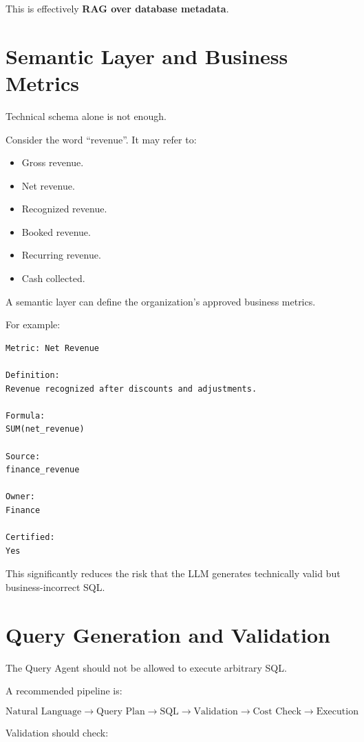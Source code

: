 \documentclass[11pt,a4paper]{article}
\begin{document}
This is effectively \textbf{RAG over database metadata}.

\section{Semantic Layer and Business Metrics}

Technical schema alone is not enough.

Consider the word ``revenue''. It may refer to:

\begin{itemize}
    \item Gross revenue.
    \item Net revenue.
    \item Recognized revenue.
    \item Booked revenue.
    \item Recurring revenue.
    \item Cash collected.
\end{itemize}

A semantic layer can define the organization's approved business metrics.

For example:

\begin{lstlisting}
Metric: Net Revenue

Definition:
Revenue recognized after discounts and adjustments.

Formula:
SUM(net_revenue)

Source:
finance_revenue

Owner:
Finance

Certified:
Yes
\end{lstlisting}

This significantly reduces the risk that the LLM generates technically valid
but business-incorrect SQL.

\section{Query Generation and Validation}

The Query Agent should not be allowed to execute arbitrary SQL.

A recommended pipeline is:

\[
\text{Natural Language}
\rightarrow
\text{Query Plan}
\rightarrow
\text{SQL}
\rightarrow
\text{Validation}
\rightarrow
\text{Cost Check}
\rightarrow
\text{Execution}
\]

Validation should check:
\end{document}
